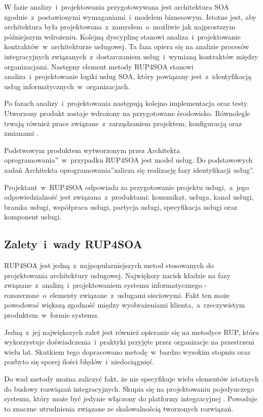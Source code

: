 W fazie analizy~i~projektowania przygotowywana jest architektura SOA zgodnie~z~postawionymi wymaganiami~i~modelem biznesowym. Istotne jest, aby architektura była projektowana~z~zamysłem~o~możliwie jak najprostszym późniejszym wdrożeniu. Kolejną dyscyplinę stanowi analiza~i~projektowanie kontraktów~w~architekturze usługowej. Ta faza opiera się na analizie procesów integracyjnych związanych~z~dostarczaniem usług~i~wymianą kontraktów między organizacjami. Następny element metody RUP4SOA stanowi analiza~i~projektowanie logiki usług SOA, który powiązany jest~z~identyfikacją usług informatycznych~w~organizacjach. 

Po fazach analizy~i~projektowania następują kolejno implementacja oraz testy. Utworzony produkt zostaje wdrożony na przygotowane środowisko. Równolegle trwają również prace związane~z~zarządzaniem projektem, konfiguracją oraz zmianami \cite{PlatIntGor}.

Podstwowym produktem wytworzonym przez \quotedblbase Architekta oprogramowania\textquotedblright~w~przypadku RUP4SOA jest model usług. Do podstawowych zadań \quotedblbase Architekta oprogramowania\textquotedblright zalicza się realizację fazy \quotedblbase identyfikacji usług\textquotedblright.

Projektant~w~RUP4SOA odpowiada za przygotowanie projektu usługi,~a~jego odpowiedzialność jest związana~z~produktami: komunikat, usługa, kanał usługi, bramka usługi, współpraca usługi, partycja usługi, specyfikacja usługi oraz komponent usługi. 

\subsection{Zalety~i~wady RUP4SOA}
RUP4SOA jest jedną~z~najpopularniejszych metod stosowanych do projektowania architektury usługowej. Największy nacisk kładzie na fazy związane~z~analizą~i~projektowaniem systemu informatycznego - rozszerzone~o~elementy związane~z~usługami sieciowymi. Fakt ten może powodować większą zgodność między wyobrażeniami klienta,~a~rzeczywistym produktem~w~formie systemu. 

Jedną~z~jej największych zalet jest również opieranie się na metodyce RUP, która wykorzystuje doświadczenia~i~praktyki przyjęte przez organizacje na przestrzeni wielu lat. \cite{JonSimRUPSoa} Skutkiem tego dopracowano metodę~w~bardzo wysokim stopniu oraz pozbyto się sporej ilości błędów~i~niedociągnięć.

Do wad metody można zaliczyć fakt, że nie specyfikuje wielu elementów istotnych do budowy rozwiązań integracyjnych. Skupia się na projektowaniu pojedynczego systemu, który może być jedynie włączony do platformy integracyjnej \cite{PlatIntGor}. Powoduje to znaczne utrudnienia związane ze skalowalnością tworzonych rozwiązań.

